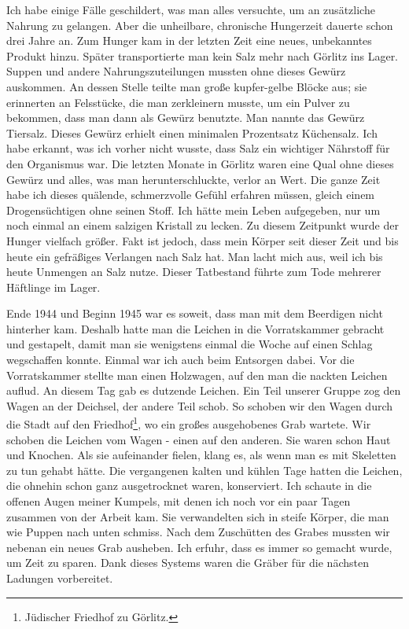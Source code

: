\documentclass[a4paper,12pt,ngerman,
]{nisebook}
\begin{document}
Ich habe einige Fälle geschildert, was man alles versuchte, um an zusätzliche Nahrung zu gelangen. Aber die unheilbare, chronische Hungerzeit dauerte schon drei Jahre an. Zum Hunger kam in der letzten Zeit eine neues, unbekanntes Produkt hinzu. Später transportierte man kein Salz mehr nach Görlitz ins Lager. Suppen und andere Nahrungszuteilungen mussten ohne dieses Gewürz auskommen. An dessen Stelle teilte man große kupfer-gelbe Blöcke aus; sie erinnerten an Felsstücke, die man zerkleinern musste, um ein Pulver zu bekommen, dass man dann als Gewürz benutzte. Man nannte das Gewürz Tiersalz. Dieses Gewürz erhielt einen minimalen Prozentsatz Küchensalz. Ich habe erkannt, was ich vorher nicht wusste, dass Salz ein wichtiger Nährstoff für den Organismus war. Die letzten Monate in Görlitz waren eine Qual ohne dieses Gewürz und alles, was man herunterschluckte, verlor an Wert. Die ganze Zeit habe ich dieses quälende, schmerzvolle Gefühl erfahren müssen, gleich einem Drogensüchtigen ohne seinen Stoff. Ich hätte mein Leben aufgegeben, nur um noch einmal an einem salzigen  Kristall zu lecken. Zu diesem Zeitpunkt wurde der Hunger vielfach größer. Fakt ist jedoch, dass mein Körper seit dieser Zeit und bis heute ein gefräßiges Verlangen nach Salz hat. Man lacht mich aus, weil ich bis heute Unmengen an Salz nutze. Dieser Tatbestand führte zum Tode mehrerer Häftlinge im Lager. 


Ende 1944 und Beginn 1945 war es soweit, dass man mit dem Beerdigen nicht hinterher kam. Deshalb hatte man die Leichen in die Vorratskammer gebracht und gestapelt, damit man sie wenigstens einmal die Woche auf einen Schlag wegschaffen konnte. Einmal war ich auch beim Entsorgen dabei. Vor die Vorratskammer stellte man einen Holzwagen, auf den man die nackten Leichen auflud. An diesem Tag gab es dutzende Leichen. Ein Teil unserer Gruppe zog den Wagen an der Deichsel, der andere Teil schob. So schoben wir den Wagen durch die Stadt auf den Friedhof\footnote{Jüdischer Friedhof zu Görlitz.}, wo ein großes ausgehobenes Grab wartete. Wir schoben die Leichen vom Wagen - einen auf den anderen. Sie waren schon Haut und Knochen. Als sie aufeinander fielen, klang es, als wenn man es mit Skeletten zu tun gehabt hätte. Die vergangenen kalten und kühlen Tage hatten die Leichen, die ohnehin schon ganz ausgetrocknet waren, konserviert. Ich schaute in die offenen Augen meiner Kumpels, mit denen ich noch vor ein paar Tagen zusammen von der Arbeit kam. Sie verwandelten sich in steife Körper, die man wie Puppen nach unten schmiss. Nach dem Zuschütten des Grabes mussten wir nebenan ein neues Grab ausheben. Ich erfuhr, dass es immer so gemacht wurde, um Zeit zu sparen. Dank dieses Systems waren die Gräber für die nächsten Ladungen vorbereitet.
\end{document}
